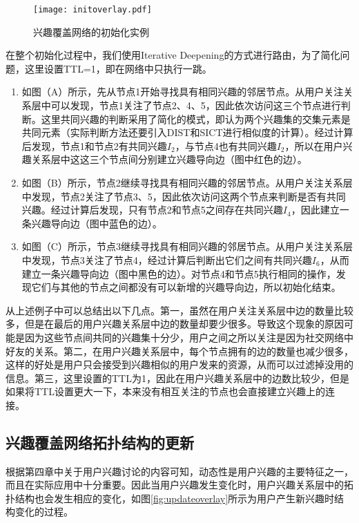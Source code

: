 \begin{figure}[!ht]
\centering
\texttt{[image: initoverlay.pdf]}
\caption{兴趣覆盖网络的初始化实例}
\label{fig:initoverlay}
\end{figure}

在整个初始化过程中，我们使用Iterative Deepening的方式进行路由，为了简化问题，这里设置TTL=1，即在网络中只执行一跳。
\begin{enumerate}
  \item 如图（A）所示，先从节点1开始寻找具有相同兴趣的邻居节点。从用户关注关系层中可以发现，节点1关注了节点2、4、5，因此依次访问这三个节点进行判断。这里共同兴趣的判断采用了简化的模式，即认为两个兴趣集的交集元素是共同元素（实际判断方法还要引入DIST和SICT进行相似度的计算）。经过计算后发现，节点1和节点2有共同兴趣$I_2$，与节点4也有共同兴趣$I_2$，所以在用户兴趣关系层中这这三个节点间分别建立兴趣导向边（图中红色的边）。
  \item 如图（B）所示，节点2继续寻找具有相同兴趣的邻居节点。从用户关注关系层中发现，节点2关注了节点3、5，因此依次访问这两个节点来判断是否有共同兴趣。经过计算后发现，只有节点2和节点5之间存在共同兴趣$I_4$，因此建立一条兴趣导向边（图中蓝色的边）。
  \item 如图（C）所示，节点3继续寻找具有相同兴趣的邻居节点。从用户关注关系层中发现，节点3关注了节点4，经过计算后判断出它们之间有共同兴趣$I_6$，从而建立一条兴趣导向边（图中黑色的边）。对节点4和节点5执行相同的操作，发现它们与其他的节点之间都没有可以新增的兴趣导向边，所以初始化结束。
\end{enumerate}

从上述例子中可以总结出以下几点。第一，虽然在用户关注关系层中边的数量比较多，但是在最后的用户兴趣关系层中边的数量却要少很多。导致这个现象的原因可能是因为这些节点间共同的兴趣集十分少，用户之间之所以关注是因为社交网络中好友的关系。第二，在用户兴趣关系层中，每个节点拥有的边的数量也减少很多，这样的好处是用户只会接受到兴趣相似的用户发来的资源，从而可以过滤掉没用的信息。第三，这里设置的TTL为1，因此在用户兴趣关系层中的边数比较少，但是如果将TTL设置更大一下，本来没有相互关注的节点也会直接建立兴趣上的连接。

\subsection{兴趣覆盖网络拓扑结构的更新}
根据第四章中关于用户兴趣讨论的内容可知，动态性是用户兴趣的主要特征之一，而且在实际应用中十分重要。因此当用户兴趣发生变化时，用户兴趣关系层中的拓扑结构也会发生相应的变化，如图\ref{fig:updateoverlay}所示为用户产生新兴趣时结构变化的过程。

